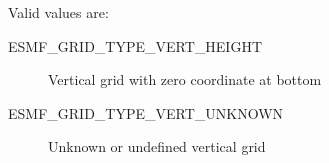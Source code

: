  Valid values are:
 \begin{description}
    \item [ESMF\_GRID\_TYPE\_VERT\_HEIGHT]
          Vertical grid with zero coordinate at bottom
    \item [ESMF\_GRID\_TYPE\_VERT\_UNKNOWN]
          Unknown or undefined vertical grid

 \end{description}

%
%


